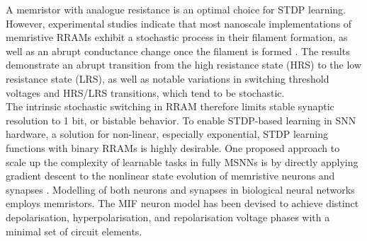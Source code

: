 \noindent A memristor with analogue resistance is an optimal choice for STDP learning. However, experimental studies indicate that most nanoscale implementations of memristive RRAMs exhibit a stochastic process in their filament formation, as well as an abrupt conductance change once the filament is formed \cite{prakash2016multilevel}. The results demonstrate an abrupt transition from the high resistance state (HRS) to the low resistance state (LRS), as well as notable variations in switching threshold voltages and HRS/LRS transitions, which tend to be stochastic.\\



\noindent The intrinsic stochastic switching in RRAM therefore limits stable synaptic resolution to 1 bit, or bistable behavior. To enable STDP-based learning in SNN hardware, a solution for non-linear, especially exponential, STDP learning functions with binary RRAMs is highly desirable. One proposed approach to scale up the complexity of learnable tasks in fully MSNNs is by directly applying gradient descent to the nonlinear state evolution of memristive neurons and synapses \cite{zhou2022memristive}. Modelling of both neurons and synapses in biological neural networks employs memristors. The MIF neuron model has been devised to achieve distinct depolarisation, hyperpolarisation, and repolarisation voltage phases with a minimal set of circuit elements.\\


